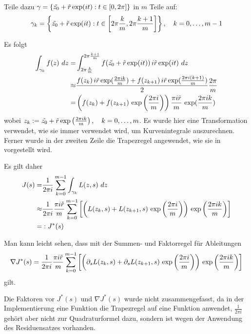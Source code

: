 \documentclass[a4paper,12pt]{report}
\newcommand{\klammer}[1]{\left(#1\right)}
\newcommand{\1}{\mathds{1}}
\theoremstyle{plain} %
\theoremstyle{definition} %
\theoremstyle{remark}
\begin{document}
            Teile dazu $\gamma = \{\Tilde{z_0}+\Tilde r\exp(it): t\in [0,2\pi]\}$ in $m$ Teile auf:
            \begin{equation}
                  \label{def: gamma_k}
                  \gamma_k = \left\{\Tilde{z_0}+\Tilde r\exp(it): t\in \left[ 2\pi \frac k m, 2\pi \frac {k+1} m\right]\right\},\quad k=0,\dots,m-1
            \end{equation}

            Es folgt
            \begin{align}
                  \int_{\gamma_k} f(z)\ dz =& \int_{2 \pi \frac k m}^{2\pi \frac {k+1} m} f(\Tilde{z_0}+\Tilde r\exp(it))\,i\Tilde r\exp(it)\ dz\label{eqn: Teilintegral Kurve zu Intergral normal}\\
                  \approx& \frac{f(z_k)\,i\Tilde r\exp(\frac{2\pi i k}{m})+f(z_{k+1})\,i\Tilde r\exp(\frac{2\pi i (k+1)}{m})}{2} \frac{2\pi} m\nonumber\\
                  =& \klammer{f(z_k)+f(z_{k+1})\,\exp\klammer{\frac{2\pi i}{m}}}\frac{\pi i \Tilde r} m \,\exp(\frac{2\pi i k}{m})\nonumber
            \end{align}
            wobei $z_k:=\Tilde{z_0}+\Tilde r\exp\klammer{\frac {2\pi ik} m}, \quad k=0,\dots,m$.
            Es wurde hier eine Transformation verwendet, wie sie immer verwendet wird, um Kurvenintegrale auszurechnen.
            Ferner wurde in der zweiten Zeile die Trapezregel angewendet, wie sie in \cite[S. 498]{numerikHermann} vorgestellt wird.
            
            Es gilt daher
            \begin{align}
                  J(s) =& \frac{1}{2\pi i}\sum_{k=0}^{m-1}\int_{\gamma_k} L(z,s)\ dz\nonumber\\
                  \approx& \frac{1}{2\pi i}\frac{\pi i \Tilde r} m\sum_{k=0}^{m-1}\left[\klammer{L(z_k, s)+L(z_{k+1}, s)\,\exp\klammer{\frac{2\pi i}{m}}}\,\exp\klammer{\frac{2\pi i k}{m}}\right]\label{def: JStern}\\
                  =&:J^*(s)\nonumber
            \end{align}

            Man kann leicht sehen, dass mit der Summen- und Faktorregel für Ableitungen
            $$\nabla J^*(s) = \frac{1}{2\pi i}\frac{\pi i \Tilde r} m\sum_{k=0}^{m-1}\left[\klammer{\partial_s L(z_k, s)+\partial_s L(z_{k+1}, s)\,\exp\klammer{\frac{2\pi i}{m}}}\,\exp\klammer{\frac{2\pi i k}{m}}\right]$$
            gilt.

            Die Faktoren vor $J^*(s)$ und $\nabla J^*(s)$ wurde nicht zusammengefasst, da in der Implementierung eine Funktion die Trapezregel auf eine Funktion anwendet,
            $\frac 1 {2\pi i}$ gehört aber nicht zur Quadraturformel dazu, sondern ist wegen der Anwendung des Residuensatzes vorhanden.
\end{document}
